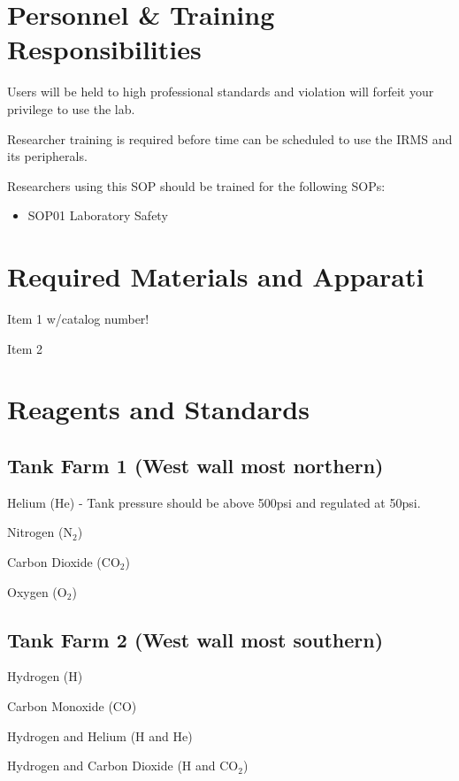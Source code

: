 \documentclass[12pt]{../SOP3_beta}\usepackage[]{graphicx}\usepackage[]{color}
\begin{document}
\section{Personnel \& Training Responsibilities}

\NP Users will be held to high professional standards and violation will forfeit your privilege to use the lab.

\NP Researcher training is required before time can be scheduled to use the IRMS and its peripherals.

\NP Researchers using this SOP should be trained for the following SOPs:

\begin{itemize}
  \item SOP01 Laboratory Safety
\end{itemize}

\section{Required Materials and Apparati}

\NP Item 1 w/catalog number!

\NP Item 2

\section{Reagents and Standards}

\subsection{Tank Farm 1 (West wall most northern)}

\NP Helium (He) - Tank pressure should be above 500psi and regulated at 50psi.

\NP Nitrogen (N$_2$)

\NP Carbon Dioxide (CO$_2$)

\NP Oxygen (O$_2$)

\subsection{Tank Farm 2 (West wall most southern)}

\NP Hydrogen (H)

\NP Carbon Monoxide (CO)

\NP Hydrogen and Helium (H and He)

\NP Hydrogen and Carbon Dioxide (H and CO$_2$)
\end{document}
